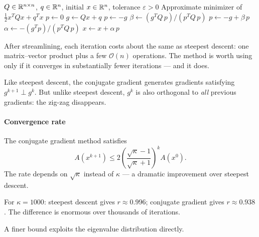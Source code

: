\begin{algorithm}
	\caption{Conjugate Gradient for Quadratic Functions (CGQ)}
	\label{alg:CGQ}
	\begin{algorithmic}[1]
		\Require $Q \in \mathbb{R}^{n \times n}$, $q \in \mathbb{R}^n$, initial $x \in \mathbb{R}^n$, tolerance $\varepsilon > 0$
		\Ensure Approximate minimizer of $\frac{1}{2} x^T Q x + q^T x$
			\State $p \gets 0$
				\State $g \gets Qx + q$
					\State $p \gets -g$ 
				\Else
					\State $\beta \gets (g^T Q\, p) / (p^T Q\, p)$
					\State $p \gets -g + \beta\, p$ 
				\EndIf
				\State $\alpha \gets -(g^T p) / (p^T Q\, p)$
				\State $x \gets x + \alpha\, p$
			\EndWhile
		\EndProcedure
	\end{algorithmic}
\end{algorithm}

After streamlining, each iteration costs about the same as steepest descent: one matrix--vector product plus a few $\mathcal{O}(n)$ operations.
The method is worth using only if it converges in substantially fewer iterations --- and it does.

Like steepest descent, the conjugate gradient generates gradients satisfying $g^{k+1} \perp g^k$.
But unlike steepest descent, $g^k$ is also orthogonal to \emph{all} previous gradients: the zig-zag disappears.

\paragraph{Convergence rate}

\begin{thm}\label{thm:cg-conv}
	The conjugate gradient method satisfies
	\begin{equation}\label{eq:cg-rate}
		A(x^{k+1}) \leq 2 \left(\frac{\sqrt{\kappa} - 1}{\sqrt{\kappa} + 1}\right)^{\!k} A(x^0).
	\end{equation}
	The rate depends on $\sqrt{\kappa}$ instead of $\kappa$ --- a dramatic improvement over steepest descent.
\end{thm}

For $\kappa = 1000$: steepest descent gives $r \approx 0.996$; conjugate gradient gives $r \approx 0.938$.
The difference is enormous over thousands of iterations.

A finer bound exploits the eigenvalue distribution directly.

